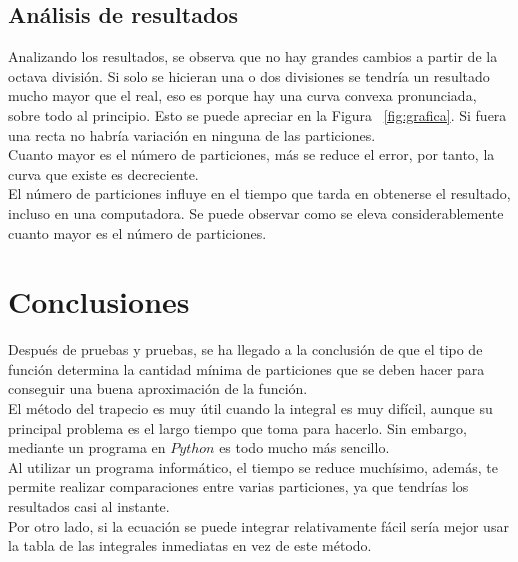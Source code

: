 \documentclass{article}
\begin{document}
    \subsection{Análisis de resultados}

     Analizando los resultados, se observa que no hay grandes cambios a partir de la octava división. Si solo se hicieran una o dos divisiones se tendría un resultado mucho mayor que el real, eso es porque hay una curva convexa pronunciada, sobre todo al principio. Esto se puede apreciar en la Figura ~\ref{fig:grafica}. Si fuera una recta no habría variación en ninguna de las particiones.\\

     Cuanto mayor es el número de particiones, más se reduce el error, por tanto, la curva que existe es decreciente.\\

     El número de particiones influye en el tiempo que tarda en obtenerse el resultado, incluso en una computadora. Se puede observar como se eleva considerablemente cuanto mayor es el número de particiones.\\


    \pagebreak

   \section{Conclusiones}
	
	Después de pruebas y pruebas, se ha llegado a la conclusión de que el tipo de función determina la cantidad mínima de particiones que se deben hacer para conseguir una buena aproximación de la función.\\

    El método del trapecio es muy útil cuando la integral es muy difícil, aunque su principal problema es el largo tiempo que toma para hacerlo. Sin embargo, mediante un programa en $Python$ es todo mucho más sencillo.\\

    Al utilizar un programa informático, el tiempo se reduce muchísimo, además, te permite realizar comparaciones entre varias particiones, ya que tendrías los resultados casi al instante.\\

    Por otro lado, si la ecuación se puede integrar relativamente fácil sería mejor usar la tabla de las integrales inmediatas en vez de este método.\\
\end{document}
